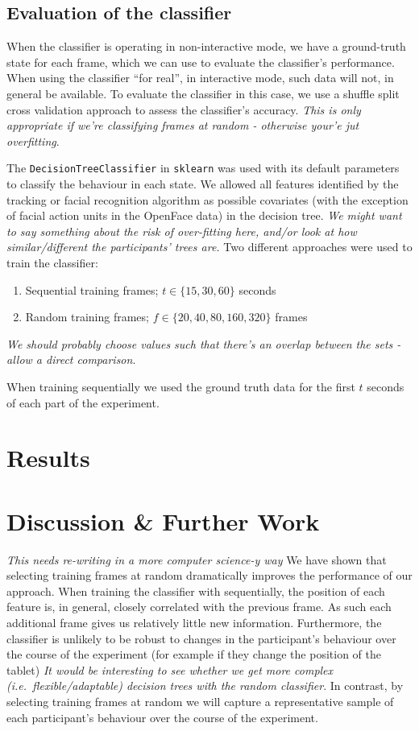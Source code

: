 \documentclass{sigchi-ext}
\begin{document}
\subsection{Evaluation of the classifier}
When the classifier is operating in non-interactive mode, we have a ground-truth state for each frame, which we can use to evaluate the classifier's performance.  When using the classifier ``for real'', in interactive mode, such data will not, in general be available.  To evaluate the classifier in this case, we use a shuffle split cross validation approach to assess the classifier's accuracy. \textit{This is only appropriate if we're classifying frames at random - otherwise your'e jut overfitting}.

The \texttt{DecisionTreeClassifier} in \texttt{sklearn} was used with its default parameters to classify the behaviour in each state.   We allowed all features identified by the tracking or facial recognition algorithm as possible covariates (with the exception of facial action units in the OpenFace data) in the decision tree.  \textit{We might want to say something about the risk of over-fitting here, and/or look at how similar/different the participants' trees are.} Two different approaches were used to train the classifier:

\begin{enumerate}\compresslist
	\item Sequential training frames; $t \in \{15,30,60\}$ seconds
	\item Random training frames; $f \in \{20, 40, 80, 160, 320\}$ frames
\end{enumerate}

\textit{We should probably choose values such that there's an overlap between the sets - allow a direct comparison}.  

When training sequentially we used the ground truth data for the first $t$ seconds of each part of the experiment.  

\section{Results}



\section{Discussion \& Further Work}
\textit{This needs re-writing in a more computer science-y way}
We have shown that selecting training frames at random dramatically improves the performance of our approach.  When training the classifier with sequentially, the position of each feature is, in general, closely correlated with the previous frame.  As such each additional frame gives us relatively little new information.  Furthermore, the classifier is unlikely to be robust to changes in the participant's behaviour over the course of the experiment (for example if they change the position of the tablet) \textit{It would be interesting to see whether we get more complex (i.e.\ flexible/adaptable) decision trees with the random classifier}.  In contrast, by selecting training frames at random we will capture a representative sample of each participant's behaviour over the course of the experiment.
\end{document}

